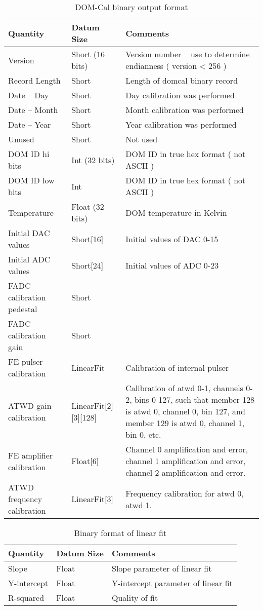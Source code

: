 \documentclass[10pt]{article}
\begin{document}
\begin{table}
\begin{tabular}{|p{4cm}|p{4cm}|p{4cm}|}
\hline
Quantity & Datum Size & Comments \\
\hline
Version & Short (16 bits) & Version number -- use to determine endianness ( version < 256 ) \\
\hline
Record Length & Short & Length of domcal binary record \\
\hline
Date -- Day & Short & Day calibration was performed \\
\hline
Date -- Month & Short & Month calibration was performed \\
\hline
Date -- Year & Short & Year calibration was performed \\
\hline
Unused & Short & Not used \\
\hline
DOM ID hi bits & Int (32 bits) & DOM ID in true hex format ( not ASCII ) \\
\hline
DOM ID low bits & Int & DOM ID in true hex format ( not ASCII ) \\
\hline
Temperature & Float (32 bits) & DOM temperature in Kelvin \\
\hline
Initial DAC values & Short[16] & Initial values of DAC 0-15 \\
\hline
Initial ADC values & Short[24] & Initial values of ADC 0-23 \\
\hline
FADC calibration pedestal & Short & \\
\hline
FADC calibration gain & Short & \\
\hline
FE pulser calibration & LinearFit & Calibration of internal pulser \\
\hline
ATWD gain calibration & LinearFit[2][3][128] & Calibration of atwd 0-1, channels 0-2, bins 0-127,
such that member 128 is atwd 0, channel 0, bin 127,
and member 129 is atwd 0, channel 1, bin 0, etc. \\
\hline
FE amplifier calibration & Float[6] & Channel 0 amplification and error,
channel 1 amplification and error, channel 2 amplification and error. \\
\hline
ATWD frequency calibration & LinearFit[3] & Frequency calibration for atwd 0, atwd 1. \\
\hline
\end{tabular}
\caption{DOM-Cal binary output format}
\label{tbl:binary}
\end{table}

\begin{table}
\begin{tabular}{|p{4cm}|p{4cm}|p{4cm}|}
\hline
Quantity & Datum Size & Comments \\
\hline
Slope & Float & Slope parameter of linear fit \\
\hline
Y-intercept & Float & Y-intercept parameter of linear fit \\
\hline
R-squared & Float & Quality of fit \\
\hline
\end{tabular}
\caption{Binary format of linear fit}
\label{tbl:linearfit}
\end{table}
\end{document}
